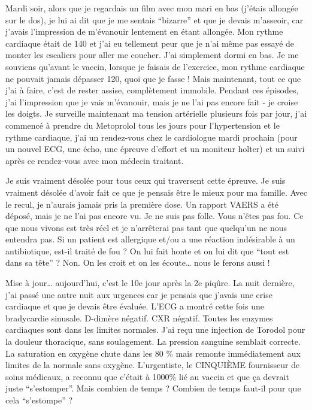 Mardi soir, alors que je regardais un film avec mon mari en bas (j'étais
allongée sur le dos), je lui ai dit que je me sentais “bizarre” et que je devais
m'asseoir, car j'avais l'impression de m'évanouir lentement en étant
allongée. Mon rythme cardiaque était de 140 et j'ai eu tellement peur que je
n'ai même pas essayé de monter les escaliers pour aller me coucher. J'ai
simplement dormi en bas. Je me souviens qu'avant le vaccin, lorsque je faisais
de l'exercice, mon rythme cardiaque ne pouvait jamais dépasser 120, quoi que je
fasse ! Mais maintenant, tout ce que j'ai à faire, c'est de rester assise,
complètement immobile. Pendant ces épisodes, j'ai l'impression que je vais
m'évanouir, mais je ne l'ai pas encore fait - je croise les doigts. Je surveille
maintenant ma tension artérielle plusieurs fois par jour, j'ai commencé à
prendre du Metoprolol tous les jours pour l'hypertension et le rythme cardiaque,
j'ai un rendez-vous chez le cardiologue mardi prochain (pour un nouvel ECG, une
écho, une épreuve d'effort et un moniteur holter) et un suivi après ce
rendez-vous avec mon médecin traitant.

Je suis vraiment désolée pour tous ceux qui traversent cette épreuve. Je suis
vraiment désolée d'avoir fait ce que je pensais être le mieux pour ma
famille. Avec le recul, je n'aurais jamais pris la première dose. Un rapport
VAERS a été déposé, mais je ne l'ai pas encore vu. Je ne suis pas folle. Vous
n'êtes pas fou. Ce que nous vivons est très réel et je n'arrêterai pas tant que
quelqu'un ne nous entendra pas. Si un patient est allergique et/ou a une
réaction indésirable à un antibiotique, est-il traité de fou ? On lui fait honte
et on lui dit que “tout est dans sa tête” ? Non. On les croit et on les écoute…
nous le ferons aussi !

Mise à jour… aujourd'hui, c'est le 10e jour après la 2e piqûre. La nuit
dernière, j'ai passé une autre nuit aux urgences car je pensais que j'avais une
crise cardiaque et que je devais être évaluée. L'ECG a montré cette fois une
bradycardie sinusale. D-dimère négatif. CXR négatif. Toutes les enzymes
cardiaques sont dans les limites normales. J'ai reçu une injection de Torodol
pour la douleur thoracique, sans soulagement. La pression sanguine semblait
correcte. La saturation en oxygène chute dans les 80 \% mais remonte
immédiatement aux limites de la normale sans oxygène. L'urgentiste, le CINQUIÈME
fournisseur de soins médicaux, a reconnu que c'était à 1000\% lié au vaccin et
que ça devrait juste “s'estomper”. Mais combien de temps ? Combien de temps
faut-il pour que cela “s'estompe” ?

